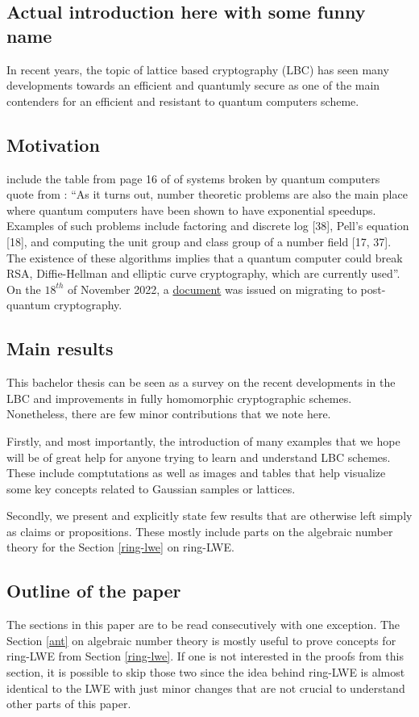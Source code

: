 \subsection{Actual introduction here with some funny name}
In recent years, the topic of lattice based cryptography (LBC) has seen many developments towards an efficient and quantumly secure  as one of the main contenders for an efficient and resistant to quantum computers scheme.
\subsection{Motivation}
include the table from page 16 of \cite{bernstein} of systems broken by quantum computers\\
quote from \cite{bernstein}: ``As it turns out, number theoretic problems are also the main place where quantum computers have been shown to have exponential speedups. Examples of such problems include factoring and discrete log [38], Pell’s equation [18], and computing the unit group and class group of a number field [17, 37]. The existence of these algorithms implies that a quantum computer could break RSA, Diffie-Hellman and elliptic curve cryptography, which are currently used''.\\
On the $18^{th}$ of November 2022, a \href{https://www.whitehouse.gov/wp-content/uploads/2022/11/M-23-02-M-Memo-on-Migrating-to-Post-Quantum-Cryptography.pdf}{document} was issued on migrating to post-quantum cryptography.
\subsection{Main results}
This bachelor thesis can be seen as a survey on the recent developments in the LBC and improvements in fully homomorphic cryptographic schemes. Nonetheless, there are few minor contributions that we note here.

Firstly, and most importantly, the introduction of many examples that we hope will be of great help for anyone trying to learn and understand LBC schemes. These include comptutations as well as images and tables that help visualize some key concepts related to Gaussian samples or lattices.

Secondly, we present and explicitly state few results that are otherwise left simply as claims or propositions. These mostly include parts on the algebraic number theory for the Section \ref{ring-lwe} on ring-LWE.
\subsection{Outline of the paper}
The sections in this paper are to be read consecutively with one exception. The Section \ref{ant} on algebraic number theory is mostly useful to prove concepts for ring-LWE from Section \ref{ring-lwe}. If one is not interested in the proofs from this section, it is possible to skip those two since the idea behind ring-LWE is almost identical to the LWE with just minor changes that are not crucial to understand other parts of this paper.

